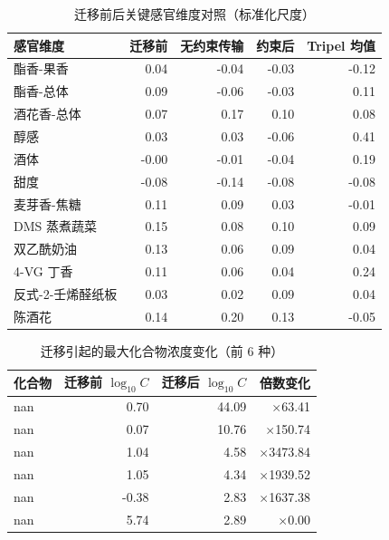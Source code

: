 \begin{table}[H]
\centering
\caption{迁移前后关键感官维度对照（标准化尺度）}
\label{tab:q3tr}
\small
\begin{fittable}
\begin{tabular}{@{}lrrrr@{}}
\toprule
感官维度 & 迁移前 & 无约束传输 & 约束后 & Tripel 均值 \\
\midrule
酯香-果香 & 0.04 & -0.04 & -0.03 & -0.12 \\
酯香-总体 & 0.09 & -0.06 & -0.03 & 0.11 \\
酒花香-总体 & 0.07 & 0.17 & 0.10 & 0.08 \\
醇感 & 0.03 & 0.03 & -0.06 & 0.41 \\
酒体 & -0.00 & -0.01 & -0.04 & 0.19 \\
甜度 & -0.08 & -0.14 & -0.08 & -0.08 \\
麦芽香-焦糖 & 0.11 & 0.09 & 0.03 & -0.01 \\
DMS 蒸煮蔬菜 & 0.15 & 0.08 & 0.10 & 0.09 \\
双乙酰奶油 & 0.13 & 0.06 & 0.09 & 0.04 \\
4-VG 丁香 & 0.11 & 0.06 & 0.04 & 0.24 \\
反式-2-壬烯醛纸板 & 0.03 & 0.02 & 0.09 & 0.04 \\
陈酒花 & 0.14 & 0.20 & 0.13 & -0.05 \\
\bottomrule
\end{tabular}
\end{fittable}
\end{table}

\begin{table}[H]
\centering
\caption{迁移引起的最大化合物浓度变化（前 6 种）}
\label{tab:q3tc}
\small
\begin{fittable}
\begin{tabular}{@{}lrrr@{}}
\toprule
化合物 & 迁移前 $\log_{10}C$ & 迁移后 $\log_{10}C$ & 倍数变化 \\
\midrule
nan & 0.70 & 44.09 & $\times$63.41 \\
nan & 0.07 & 10.76 & $\times$150.74 \\
nan & 1.04 & 4.58 & $\times$3473.84 \\
nan & 1.05 & 4.34 & $\times$1939.52 \\
nan & -0.38 & 2.83 & $\times$1637.38 \\
nan & 5.74 & 2.89 & $\times$0.00 \\
\bottomrule
\end{tabular}
\end{fittable}
\end{table}

